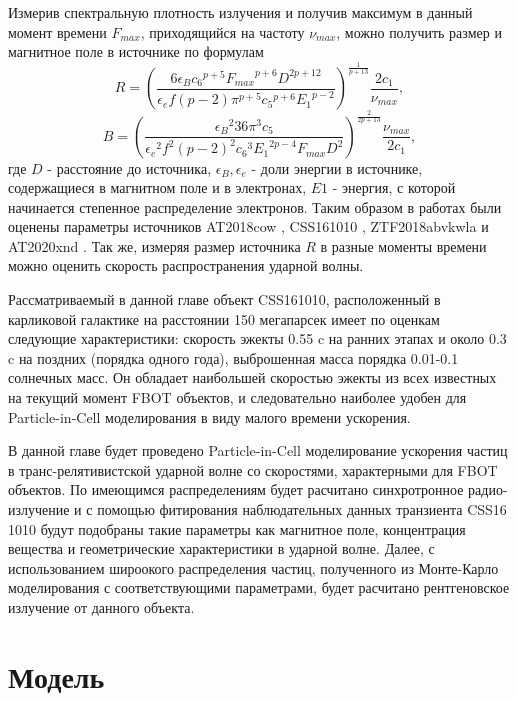 Измерив спектральную плотность излучения и получив максимум в данный момент времени $F_{max}$, приходящийся на частоту $\nu_{max}$, можно получить размер и магнитное поле в источнике по формулам
\begin{equation}\label{ChevR}
R = {\left( \frac {6 \epsilon_B {c_6}^{p+5}{F_{max}}^{p+6}{
			D}^{2p+12}}{\epsilon_e f \left( p-2 \right) {\pi}^{p+5}{{c_5}}^{p+6}
		{E_1}^{p-2}} \right)} ^{ \frac{1}{p+13} } \frac{2 c_1}{\nu_{max}},
\end{equation}
\begin{equation}\label{ChevB}
B = { \left(\frac {{\epsilon_B}^2 36 {\pi}^{3}{c_5}}{{
			\epsilon_e}^{2}{f}^{2} \left( p-2 \right) ^{2}{{c_6}}^{3}{{E_1}}^{2 p-4}F_{max}{D}^{2}} \right)}
^{\frac{2}{2p+13}}\frac{\nu_{max}}{2 c_1},
\end{equation}
где $D$ - расстояние до источника, $\epsilon_B, \epsilon_e$ - доли энергии в источнике, содержащиеся в магнитном поле и в электронах, $E1$ - энергия, с которой начинается степенное распределение электронов. Таким образом в работах  были оценены параметры источников AT2018cow \cite{Ho2019cow}, CSS161010 \cite{Coppejans2020}, ZTF2018abvkwla \cite{Ho2020} и AT2020xnd \cite{Ho2021, Bright2021}. Так же, измеряя размер источника $R$ в разные моменты времени можно оценить скорость распространения ударной волны.

Рассматриваемый в данной главе объект CSS161010, расположенный в карликовой галактике на расстоянии 150 мегапарсек имеет по оценкам следующие\cite{Coppejans2020} характеристики: скорость эжекты 0.55 c на ранних этапах и около 0.3 c на поздних (порядка одного года), выброшенная масса порядка 0.01-0.1 солнечных масс. Он обладает наибольшей скоростью эжекты из всех известных на текущий момент FBOT объектов, и следовательно наиболее удобен для Particle-in-Cell моделирования в виду малого времени ускорения.


В данной главе будет проведено Particle-in-Cell моделирование ускорения частиц в транс-релятивистской ударной волне со скоростями, характерными для FBOT объектов. По имеющимся распределениям будет расчитано синхротронное радио-излучение и с помощью фитирования наблюдательных данных транзиента CSS16 1010 будут подобраны такие параметры как магнитное поле, концентрация вещества и геометрические характеристики в ударной волне. Далее, с использованием широокого распределения частиц, полученного из Монте-Карло моделирования с соответствующими параметрами, будет расчитано рентгеновское излучение от данного объекта.
\section{Модель}
